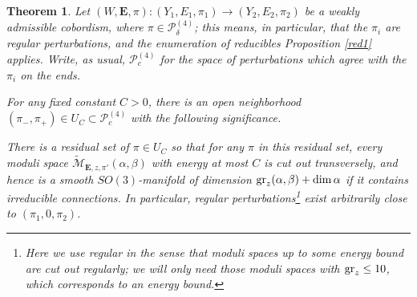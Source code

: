 \documentclass{memo-l}
\newtheorem{theorem}{Theorem}[chapter]
\theoremstyle{definition}
\theoremstyle{remark}
\numberwithin{section}{chapter}
\numberwithin{equation}{chapter}
\begin{document}
\begin{theorem}\label{trans3}Let $(W,\mathbf{E},\pi): (Y_1, E_1,\pi_1) \to (Y_2, E_2,\pi_2)$ be a weakly admissible cobordism, where $\pi \in \mathcal P^{(4)}_\delta$; this means, in particular, that the $\pi_i$ are regular perturbations, and the enumeration of reducibles Proposition \ref{red1} applies. Write, as usual, $\mathcal P^{(4)}_c$ for the space of perturbations which agree with the $\pi_i$ on the ends.

For any fixed constant $C > 0$, there is an open neighborhood $(\pi_-, \pi_+) \in U_C \subset \mathcal P^{(4)}_c$ with the following significance.

There is a residual set of $\pi \in U_C$ so that for any $\pi$ in this residual set, every moduli space $\widetilde{\mathcal M}_{\mathbf{E},z,\pi'}(\alpha, \beta)$ with energy at most $C$ is cut out transversely, and hence is a smooth $SO(3)$-manifold of dimension $\textup{gr}_z(\alpha, \beta) + \dim \alpha$ if it contains irreducible connections. In particular, regular perturbations\footnote{Here we use regular in the sense that moduli spaces up to some energy bound are cut out regularly; we will only need those moduli spaces with $\textup{gr}_z \leq 10$, which corresponds to an energy bound.} exist arbitrarily close to $(\pi_1, 0, \pi_2)$.
\end{theorem}
\end{document}
